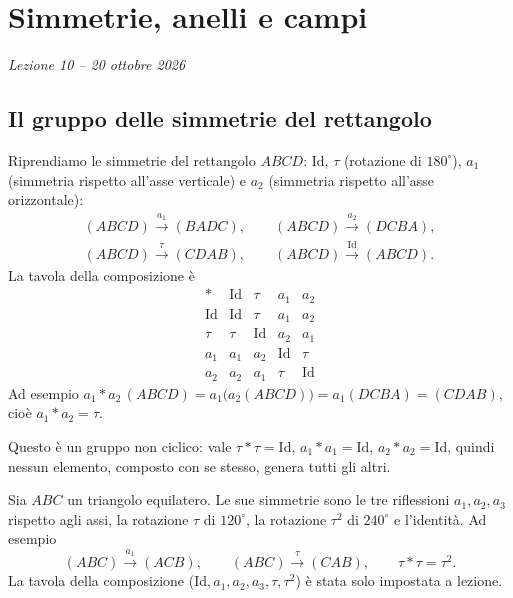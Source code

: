 \documentclass[11pt,a4paper]{article}
\begin{document}
\section[Simmetrie, anelli e campi (Lezione 10 -- 20 ottobre 2026)]{Simmetrie, anelli e campi}
\noindent\emph{Lezione 10 -- 20 ottobre 2026}
\subsection{Il gruppo delle simmetrie del rettangolo}

Riprendiamo le simmetrie del rettangolo $ABCD$: $\mathrm{Id}$, $\tau$ (rotazione di $180^\circ$), $a_1$ (simmetria rispetto all'asse verticale) e $a_2$ (simmetria rispetto all'asse orizzontale):
\[
  \begin{gathered}
  (ABCD) \xrightarrow{a_1} (BADC), \qquad
  (ABCD) \xrightarrow{a_2} (DCBA), \\
  (ABCD) \xrightarrow{\tau} (CDAB), \qquad
  (ABCD) \xrightarrow{\mathrm{Id}} (ABCD).
  \end{gathered}
\]
La tavola della composizione è
\[
\begin{array}{c|cccc}
  * & \mathrm{Id} & \tau & a_1 & a_2 \\ \hline
  \mathrm{Id} & \mathrm{Id} & \tau & a_1 & a_2 \\
  \tau & \tau & \mathrm{Id} & a_2 & a_1 \\
  a_1 & a_1 & a_2 & \mathrm{Id} & \tau \\
  a_2 & a_2 & a_1 & \tau & \mathrm{Id}
\end{array}
\]
Ad esempio $a_1 * a_2\,(ABCD) = a_1\big(a_2(ABCD)\big) = a_1(DCBA) = (CDAB)$, cioè $a_1 * a_2 = \tau$.

\begin{esempio}
Questo è un gruppo non ciclico: vale $\tau * \tau = \mathrm{Id}$, $a_1 * a_1 = \mathrm{Id}$, $a_2 * a_2 = \mathrm{Id}$, quindi nessun elemento, composto con se stesso, genera tutti gli altri.
\end{esempio}

\begin{esempio}
Sia $ABC$ un triangolo equilatero. Le sue simmetrie sono le tre riflessioni $a_1, a_2, a_3$ rispetto agli assi, la rotazione $\tau$ di $120^\circ$, la rotazione $\tau^2$ di $240^\circ$ e l'identità. Ad esempio
\[
  (ABC) \xrightarrow{a_1} (ACB), \qquad (ABC) \xrightarrow{\tau} (CAB), \qquad \tau * \tau = \tau^2 .
\]
La tavola della composizione ($\mathrm{Id}, a_1, a_2, a_3, \tau, \tau^2$) è stata solo impostata a lezione.
\end{esempio}
\end{document}
